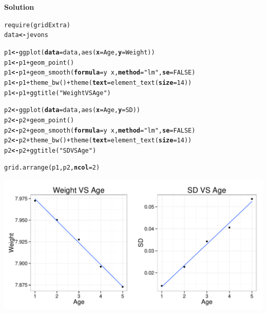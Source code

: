 \documentclass[12pt,oneside,a4paper]{article}\usepackage[]{graphicx}\usepackage[]{xcolor}
\makeatletter
\newcommand{\hlnum}[1]{\textcolor[rgb]{0,0,0}{#1}}%
\newcommand{\hlstr}[1]{\textcolor[rgb]{0,0,1}{#1}}%
\newcommand{\hlopt}[1]{\textcolor[rgb]{0,0,0}{#1}}%
\newcommand{\hlstd}[1]{\textcolor[rgb]{0,0,0}{#1}}%
\newcommand{\hlkwb}[1]{\textcolor[rgb]{0.498,0,0.333}{\textbf{#1}}}%
\newcommand{\hlkwc}[1]{\textcolor[rgb]{0.498,0,0.333}{\textbf{#1}}}%
\newcommand{\hlkwd}[1]{\textcolor[rgb]{0,0,0}{#1}}%
\newenvironment{kframe}{%
 \def\at@end@of@kframe{}%
 \ifinner\ifhmode%
  \def\at@end@of@kframe{\end{minipage}}%
  \begin{minipage}{\columnwidth}%
 \fi\fi%
 \def\FrameCommand##1{\hskip\@totalleftmargin \hskip-\fboxsep
 \colorbox{shadecolor}{##1}\hskip-\fboxsep
     \hskip-\linewidth \hskip-\@totalleftmargin \hskip\columnwidth}%
 \MakeFramed {\advance\hsize-\width
   \@totalleftmargin\z@ \linewidth\hsize
   \@setminipage}}%
 {\par\unskip\endMakeFramed%
 \at@end@of@kframe}
\newenvironment{knitrout}{}{} %
\newcommand{\solution}
{
    \vspace{15pt}
    \noindent\ignorespaces\textbf{\large Solution}\par
}
\makeatother
\begin{document}
\solution
\begin{knitrout}
\color{fgcolor}\begin{kframe}
\begin{alltt}
\hlkwd{require}\hlstd{(gridExtra)}
\hlstd{data} \hlkwb{<-} \hlstd{jevons}

\hlstd{p1} \hlkwb{<-} \hlkwd{ggplot}\hlstd{(}\hlkwc{data} \hlstd{= data,} \hlkwd{aes}\hlstd{(}\hlkwc{x} \hlstd{= Age,} \hlkwc{y} \hlstd{= Weight))}
\hlstd{p1} \hlkwb{<-} \hlstd{p1} \hlopt{+} \hlkwd{geom_point}\hlstd{()}
\hlstd{p1} \hlkwb{<-} \hlstd{p1} \hlopt{+} \hlkwd{geom_smooth}\hlstd{(}\hlkwc{formula} \hlstd{= y} \hlopt{~} \hlstd{x,} \hlkwc{method} \hlstd{=} \hlstr{"lm"}\hlstd{,} \hlkwc{se} \hlstd{=} \hlnum{FALSE}\hlstd{)}
\hlstd{p1} \hlkwb{<-} \hlstd{p1} \hlopt{+} \hlkwd{theme_bw}\hlstd{()} \hlopt{+} \hlkwd{theme}\hlstd{(}\hlkwc{text} \hlstd{=} \hlkwd{element_text}\hlstd{(}\hlkwc{size} \hlstd{=} \hlnum{14}\hlstd{))}
\hlstd{p1} \hlkwb{<-} \hlstd{p1} \hlopt{+} \hlkwd{ggtitle}\hlstd{(}\hlstr{"Weight VS Age"}\hlstd{)}

\hlstd{p2} \hlkwb{<-} \hlkwd{ggplot}\hlstd{(}\hlkwc{data} \hlstd{= data,} \hlkwd{aes}\hlstd{(}\hlkwc{x} \hlstd{= Age,} \hlkwc{y} \hlstd{= SD))}
\hlstd{p2} \hlkwb{<-} \hlstd{p2} \hlopt{+} \hlkwd{geom_point}\hlstd{()}
\hlstd{p2} \hlkwb{<-} \hlstd{p2} \hlopt{+} \hlkwd{geom_smooth}\hlstd{(}\hlkwc{formula} \hlstd{= y} \hlopt{~} \hlstd{x,} \hlkwc{method} \hlstd{=} \hlstr{"lm"}\hlstd{,} \hlkwc{se} \hlstd{=} \hlnum{FALSE}\hlstd{)}
\hlstd{p2} \hlkwb{<-} \hlstd{p2} \hlopt{+} \hlkwd{theme_bw}\hlstd{()} \hlopt{+} \hlkwd{theme}\hlstd{(}\hlkwc{text} \hlstd{=} \hlkwd{element_text}\hlstd{(}\hlkwc{size} \hlstd{=} \hlnum{14}\hlstd{))}
\hlstd{p2} \hlkwb{<-} \hlstd{p2} \hlopt{+} \hlkwd{ggtitle}\hlstd{(}\hlstr{"SD VS Age"}\hlstd{)}

\hlkwd{grid.arrange}\hlstd{(p1, p2,} \hlkwc{ncol}\hlstd{=}\hlnum{2}\hlstd{)}
\end{alltt}
\end{kframe}

{\centering \includegraphics[width=.9\linewidth]{figure/p781} 

}



\end{knitrout}
\end{document}
